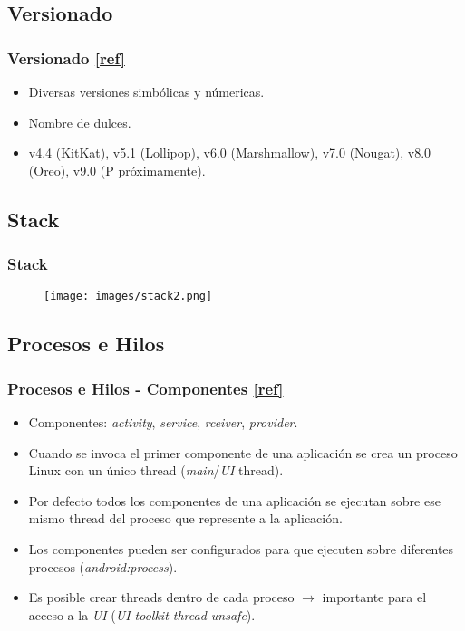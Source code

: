 \subsection{Versionado}
\begin{frame}
  \frametitle{Versionado \href{https://es.wikipedia.org/wiki/Anexo:Historial\_de\_versiones\_de\_Android}{[ref]}}
  \begin{itemize}
    \item Diversas versiones simbólicas y númericas.
    
    \item Nombre de dulces.
    
    \item v4.4 (KitKat), v5.1 (Lollipop), v6.0 (Marshmallow), v7.0 (Nougat), v8.0 (Oreo), v9.0 (P próximamente).
  \end{itemize}
\end{frame}

\subsection{Stack}
\begin{frame}
  \frametitle{Stack}
  \begin{figure}
      \texttt{[image: images/stack2.png]}
  \end{figure}
\end{frame}

\subsection{Procesos e Hilos}
\begin{frame}
  \frametitle{Procesos e Hilos - Componentes \href{https://developer.android.com/guide/components/processes-and-threads}{[ref]}}
  \begin{itemize}
    \item Componentes: \textit{activity}, \textit{service}, \textit{rceiver}, \textit{provider}.

    \item Cuando se invoca el primer componente de una aplicación se crea un proceso Linux con un único thread (\textit{main}/\textit{UI} thread).
    
    \item Por defecto todos los componentes de una aplicación se ejecutan sobre ese mismo thread del proceso que represente a la aplicación.
    
    \item Los componentes pueden ser configurados para que ejecuten sobre diferentes procesos (\textit{android:process}).
    
    \item Es posible crear threads dentro de cada proceso $\rightarrow$ importante para el acceso a la \textit{UI} (\emph{UI toolkit thread unsafe}).
  \end{itemize}
\end{frame}

